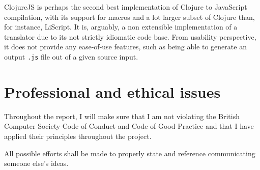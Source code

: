 ClojureJS is perhaps the second best implementation of Clojure to JavaScript compilation, with its support for macros and a lot larger subset of Clojure than, for instance, LiScript. 
It is, arguably, a non extensible implementation of a translator due to its not strictly idiomatic code base. From usability perspective, it does not provide any ease-of-use features, such as being able to generate an output \texttt{.js} file out of a given source input. 

\section{Professional and ethical issues}
Throughout the report, I will make sure that I am not violating the British Computer Society Code of Conduct and Code of Good Practice and that I have applied their principles throughout the project.

All possible efforts shall be made to properly state and reference communicating someone else's ideas.
